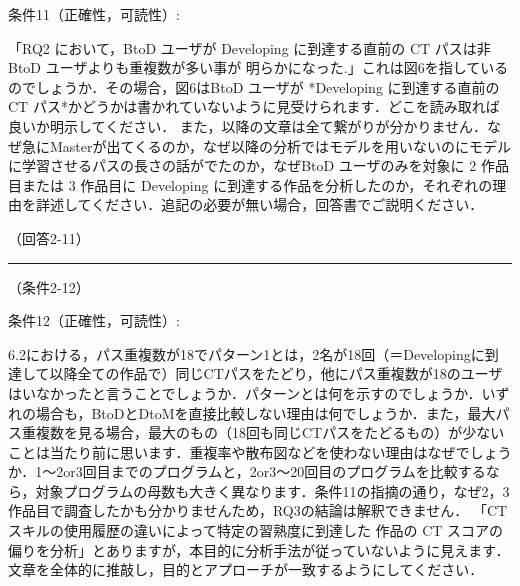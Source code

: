 \documentclass{jarticle} %
\def\subsection#1{ \vspace{1pc} {\gt #1} }
\def\nextans{ \vspace{2pc} \hrule }
\begin{document}
条件11（正確性，可読性）: 

「RQ2 において，BtoD ユーザが Developing に到達する直前の CT パスは非 BtoD ユーザよりも重複数が多い事が 明らかになった.」これは図6を指しているのでしょうか．その場合，図6はBtoD ユーザが *Developing に到達する直前の CT パス*かどうかは書かれていないように見受けられます．どこを読み取れば良いか明示してください．
また，以降の文章は全て繋がりが分かりません．なぜ急にMasterが出てくるのか，なぜ以降の分析ではモデルを用いないのにモデルに学習させるパスの長さの話がでたのか，なぜBtoD ユーザのみを対象に 2 作品目または 3 作品目に Developing に到達する作品を分析したのか，それぞれの理由を詳述してください．追記の必要が無い場合，回答書でご説明ください．

\subsection{（回答2-11）}


\newpage
\nextans
\subsection{（条件2-12）}

条件12（正確性，可読性）: 

6.2における，パス重複数が18でパターン1とは，2名が18回（＝Developingに到達して以降全ての作品で）同じCTパスをたどり，他にパス重複数が18のユーザはいなかったと言うことでしょうか．パターンとは何を示すのでしょうか．いずれの場合も，BtoDとDtoMを直接比較しない理由は何でしょうか．また，最大パス重複数を見る場合，最大のもの（18回も同じCTパスをたどるもの）が少ないことは当たり前に思います．重複率や散布図などを使わない理由はなぜでしょうか．1〜2or3回目までのプログラムと，2or3〜20回目のプログラムを比較するなら，対象プログラムの母数も大きく異なります．条件11の指摘の通り，なぜ2，3作品目で調査したかも分かりませんため，RQ3の結論は解釈できません．
「CT スキルの使用履歴の違いによって特定の習熟度に到達した 作品の CT スコアの偏りを分析」とありますが，本目的に分析手法が従っていないように見えます．文章を全体的に推敲し，目的とアプローチが一致するようにしてください．
\end{document}
